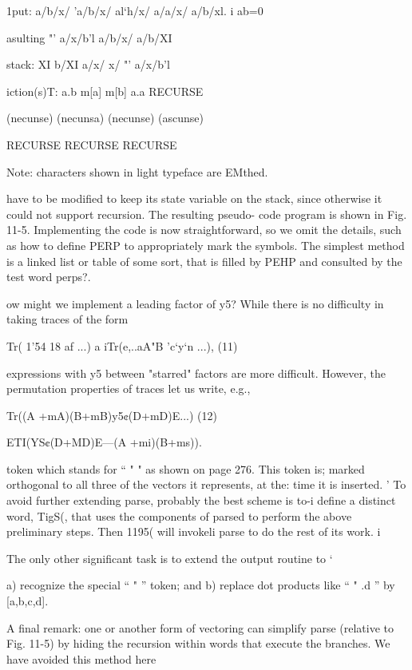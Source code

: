  

1put: a/b/x/ 'a/b/x/ al‘h/x/ a/a/x/ a/b/xl. i
ab=0

asulting "' a/x/b'l a/b/x/ a/b/XI

stack: XI b/XI a/x/ x/ "' a/x/b’l

iction(s)T: a.b m[a] m[b] a.a RECURSE

 

(necunse) (necunsa) (necunse) (ascunse)

RECURSE RECURSE RECURSE

 

Note: characters shown in light typeface are EMthed.

 

have to be modified to keep its state variable on the stack, since
otherwise it could not support recursion. The resulting pseudo-
code program is shown in Fig. 11-5. Implementing the code is now
straightforward, so we omit the details, such as how to define
PERP to appropriately mark the symbols. The simplest method
is a linked list or table of some sort, that is filled by PEHP and
consulted by the test word perps?.

ow might we implement a leading factor of y5? While there
is no difficulty in taking traces of the form

Tr( 1'54 18 af ...) a iTr(e,..aA"B ’c‘y‘n ...), (11)

expressions with y5 between "starred" factors are more difficult.
However, the permutation properties of traces let us write, e.g.,

Tr((A +mA)(B+mB)y5¢(D+mD)E...)
(12)

ETI(YS¢(D+MD)E---(A +mi)(B+ms)).


token which stands for “ " " as shown on page 276. This token is;
marked orthogonal to all three of the vectors it represents, at the:
time it is inserted. '
To avoid further extending parse, probably the best scheme is to-i
define a distinct word, TigS(, that uses the components of parsed
to perform the above preliminary steps. Then 1195( will invokeli
parse to do the rest of its work. i

The only other significant task is to extend the output routine to ‘

a) recognize the special “ " ” token; and
b) replace dot products like “ " .d ” by [a,b,c,d].

A final remark: one or another form of vectoring can simplify
parse (relative to Fig. 11-5) by hiding the recursion within words
that execute the branches. We have avoided this method here


